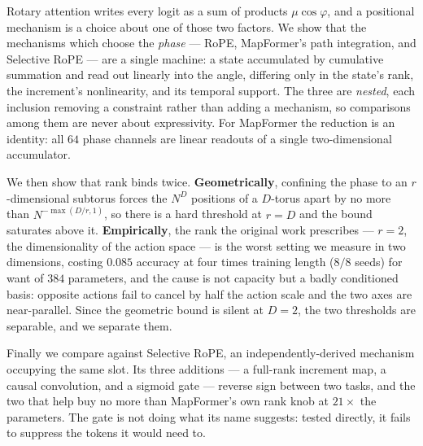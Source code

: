 \noindent
Rotary attention writes every logit as a sum of products $\mu\cos\varphi$, and a
positional mechanism is a choice about one of those two factors. We show that the
mechanisms which choose the \emph{phase} --- RoPE, MapFormer's path integration,
and Selective RoPE --- are a single machine: a state accumulated by cumulative
summation and read out linearly into the angle, differing only in the state's
rank, the increment's nonlinearity, and its temporal support. The three are
\emph{nested}, each inclusion removing a constraint rather than adding a
mechanism, so comparisons among them are never about expressivity. For MapFormer
the reduction is an identity: all $64$ phase channels are linear readouts of a
single two-dimensional accumulator.

We then show that rank binds twice. \textbf{Geometrically}, confining the phase to
an $r$-dimensional subtorus forces the $N^{D}$ positions of a $D$-torus apart by
no more than $N^{-\max(D/r,1)}$, so there is a hard threshold at $r=D$ and the
bound saturates above it. \textbf{Empirically}, the rank the original work
prescribes --- $r=2$, the dimensionality of the action space --- is the worst
setting we measure in two dimensions, costing $0.085$ accuracy at four times
training length ($8/8$ seeds) for want of $384$ parameters, and the cause is not
capacity but a badly conditioned basis: opposite actions fail to cancel by half
the action scale and the two axes are near-parallel. Since the geometric bound is
silent at $D=2$, the two thresholds are separable, and we separate them.

Finally we compare against Selective RoPE, an independently-derived mechanism
occupying the same slot. Its three additions --- a full-rank increment map, a
causal convolution, and a sigmoid gate --- reverse sign between two tasks, and the
two that help buy no more than MapFormer's own rank knob at $21\times$ the
parameters. The gate is not doing what its name suggests: tested directly, it
fails to suppress the tokens it would need to.


